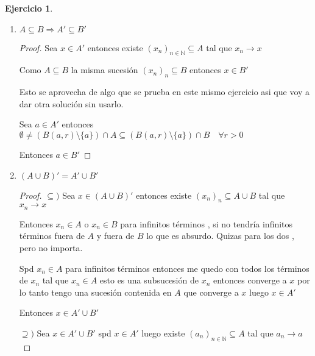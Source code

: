 \documentclass[11pt]{report}
\newcommand{\N}{\mathbb{N}}
\newcommand{\ra}{\rightarrow}
\theoremstyle{definition}
\newtheorem{ej}{Ejercicio}
\begin{document}
\begin{ej}
\begin{enumerate}
\begin{enumerate}
\begin{proof}
	    Entonces existe un $p_1 \in A'$ tal que $d(p_1,p) < \frac{r}{2}$ con $p_1 \neq p$ 

	    Además $p_1 \in A'$ luego $(B(p_1,\frac{r}{2})\setminus\{p_1\})\cap A \neq \emptyset$ 

	    Entonces $\exists a \in A$ tal que $d(a,p_1) < \frac{r}{2}$ 

	    Ahora $d(a,p) \leq d(a,p_1) + d(p_1,p) = \frac{r}{2} + \frac{r}{2} = r$ 

	    Entonces $a \in B(p,r)$ además $a \in A$ y $a\neq p$ por lo tanto $(B(p,r)\setminus\{p\})\cap A \neq \emptyset$

	    Y esto lo podemos hacer para cualquier $r$. 

	    Finalmente $p$ es punto de acumulación de $A$ o lo que es lo mismo $p \in A'$
	  \end{proof}
	\item $A \subseteq B \Longrightarrow A' \subseteq B'$
	  \begin{proof}
	    Sea $x \in A'$ entonces existe $(x_{n} )_{n \in \N} \subseteq A$ tal que $x_{n} \ra x$

	    Como $A \subseteq B$ la misma sucesión $(x_{n})_{n} \subseteq B$ entonces $x \in B'$

	    Esto se aprovecha de algo que se prueba en este mismo ejercicio asi que voy a dar otra solución sin usarlo.

	    Sea $a \in A'$ entonces $\emptyset \neq (B(a,r)\setminus \{a\}) \cap A  \subseteq (B(a,r)\setminus \{a\}) \cap B\quad \forall r>0 $

	    Entonces $a \in B' $
	  \end{proof}
	\item $(A \cup B)' = A' \cup B'$
	  \begin{proof}
	  $\subseteq )$ Sea $x \in (A \cup B)'$ entonces existe $(x_{n})_{n} \subseteq A \cup B$ tal que $x_{n} \ra x$

	    Entonces $x_{n} \in A$ o $x_{n} \in B$ para infinitos términos , si no tendría infinitos términos fuera de $A$ y fuera de $B$ lo que es absurdo. Quizas para los dos , pero no importa.

	    Spd $x_{n} \in A$ para infinitos términos entonces me quedo con todos los términos de $x_{n}$ tal que $x_{n} \in A$ esto es una subsucesión de $x_{n}$ entonces converge a $x$ por lo tanto tengo una sucesión contenida en $A$ que converge a $x$ luego $x \in A'$

	    Entonces $x \in A' \cup B'$

	  $\supseteq )$ Sea $x \in A' \cup B'$ spd $x \in A'$ luego existe $(a_{n})_{n \in \N} \subseteq A$ tal que $a_{n} \ra a$


\end{proof}
\end{enumerate}
\end{enumerate}
\end{ej}
\end{document}
